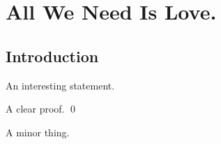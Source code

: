 \documentclass{report}
\begin{document}
\chapter{All We Need Is Love.}
\section{Introduction}
\begin{thm}
	An interesting statement.
\end{thm}
\begin{prf}
	A clear proof.
	\qed\end{prf}

\begin{rem}
	A minor thing.
	\fin\end{rem}
\end{document}
